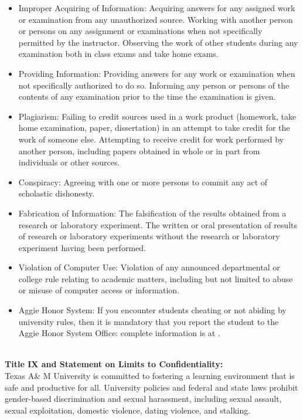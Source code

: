 \documentclass[letterpaper,10pt]{report}
\newcommand{\webURL}[1]{\urlstyle{same}{ \textit{\textcolor{darkgray}{\url{#1}}}}}
\begin{document}
\begin{itemize}   \setlength\itemsep{0.05em}

\item  Improper Acquiring of Information: Acquiring answers for any assigned work or 
examination from any unauthorized source. Working with another person or persons on 
any assignment or examinations when not specifically permitted by the instructor.
Observing the work of other students during any examination both in class exams and 
take home exams.
\item  Providing Information: Providing answers for any work or examination when not 
specifically authorized to do so. Informing any person or persons of the contents of any 
examination prior to the time the examination is given.
\item  Plagiarism: Failing to credit sources used in a work product (homework, take home 
examination, paper, dissertation) in an attempt to take credit for the work of someone 
else. Attempting to receive credit for work performed by another person, including papers 
obtained in whole or in part from individuals or other sources.
\item  Conspiracy: Agreeing with one or more persons to commit any act of scholastic 
dishonesty.
\item  Fabrication of Information: The falsification of the results obtained from a research or 
laboratory experiment. The written or oral presentation of results of research or 
laboratory experiments without the research or laboratory experiment having been 
performed.
\item  Violation of Computer Use: Violation of any announced departmental or college rule 
relating to academic matters, including but not limited to abuse or misuse of computer 
access or information.
\item  Aggie Honor System: If you encounter students cheating or not abiding by university 
rules, then it is mandatory that you report the student to the Aggie Honor System Office: 
complete information is at \webURL{aggiehonor.tamu.edu}.
 \end{itemize}
\:\
 \\
\textbf{	Title	IX	and	Statement	on	Limits	to	Confidentiality:}\\
Texas	A\& M	University	is	committed	to	fostering	a	learning	environment	that	is	safe	and	productive	for	all.	
University	 policies	 and	 federal	 and	 state	 laws	 prohibit	 gender-based	 discrimination	 and	 sexual	
harassment,	including	sexual	assault,	sexual	exploitation,	domestic	violence,	dating	violence,	and	stalking.
\end{document}
